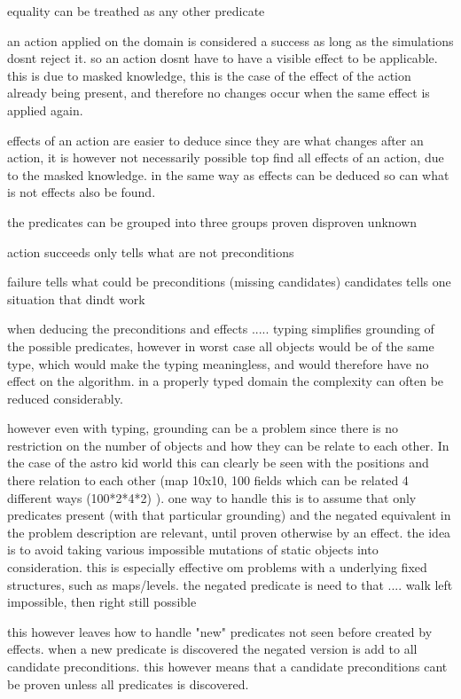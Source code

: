 	equality can be treathed as any other predicate
	
	
	an action applied on the domain is considered a success as long as the simulations dosnt reject it. so an action dosnt have to have a visible effect to be applicable. this is due to masked knowledge, this is the case of the effect of the action already being present, and therefore no changes occur when the same effect is applied again.
	
	effects of an action are easier to deduce since they are what changes after an action, it is however not necessarily possible top find all effects of an action, due to the masked knowledge. in the same way as effects can be deduced so can what is not effects also be found. 

	
	
	
	the predicates can be grouped into three groups
		proven
		disproven
		unknown
		
	action 	
		succeeds
			only tells what are not preconditions
			
		failure
			tells what could be preconditions (missing candidates)
				candidates
			tells one situation that dindt work
	


	
	
			
	when deducing the preconditions and effects ..... typing simplifies grounding of the possible predicates, however in worst case all objects would be of the same type, which would make the typing meaningless, and would therefore have no effect on the algorithm. 
	in a properly typed domain the complexity can often be reduced considerably.
	
	
	however even with typing, grounding can be a problem since there is no restriction on the number of objects and how they can be relate to each other. In the case of the astro kid world this can clearly be seen with the positions and there relation to each other (map 10x10, 100 fields which can be related 4 different ways (100*2*4*2) ).
	one way to handle this is to assume that only predicates present (with that particular grounding) and the negated equivalent in the problem description are relevant, until proven otherwise by an effect. the idea is to avoid taking various impossible mutations of static objects into consideration. this is especially effective om problems with a underlying fixed structures, such as maps/levels. the negated predicate is need to that .... walk left impossible, then right still possible
	
	this however leaves how to handle "new" predicates not seen before created by effects. when a new predicate is discovered the negated version is add to all candidate preconditions. this however means that a candidate preconditions cant be proven unless all predicates is discovered. 

